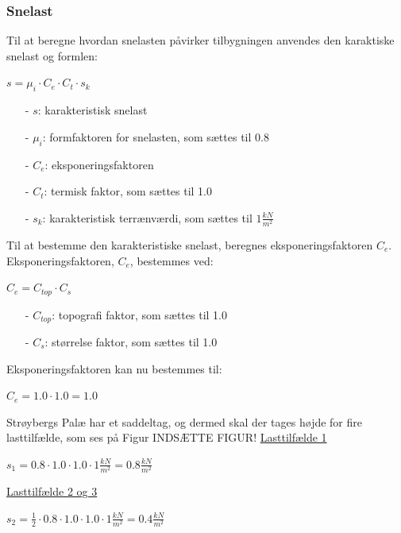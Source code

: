 \subsubsection{Snelast}
Til at beregne hvordan snelasten påvirker tilbygningen anvendes den karaktiske snelast og formlen:
\begin{center}
$s=\mu_i\cdot C_e\cdot C_t \cdot s_k$
\end{center}
\begin{itemize}
	\item[-] $s$: karakteristisk snelast
	\item[-] $\mu_i$: formfaktoren for snelasten, som sættes til 0.8 \citep[ tabel 5.2 kapitel 5.3]{EU91}
	\item[-] $C_e$: eksponeringsfaktoren
	\item[-] $C_t$: termisk faktor, som sættes til 1.0 \citep[ kapitel 5.2]{EU91}
	\item[-] $s_k$: karakteristisk terrænværdi, som sættes til $1 \frac{kN}{m^2}$ \citep[ kapitel 4.1]{EU91}
\end{itemize}
Til at bestemme den karakteristiske snelast, beregnes eksponeringsfaktoren $C_e$.
\newline
\newline
Eksponeringsfaktoren, $C_e$, bestemmes ved:
\begin{center}
$C_e=C_{top}\cdot C_s$
\end{center}
\begin{itemize}
	\item[-] $C_{top}$: topografi faktor, som sættes til 1.0 \citep[ tabel 5.1 kapitel 5.2]{EU91}
	\item[-] $C_s$: størrelse faktor, som sættes til 1.0 \citep[ kapitel 5.2]{EU91}
\end{itemize}
Eksponeringsfaktoren kan nu bestemmes til:
\begin{center}
$C_e=1.0\cdot 1.0=1.0$
\end{center}
Strøybergs Palæ har et saddeltag, og dermed skal der tages højde for fire lasttilfælde, som ses på Figur INDSÆTTE FIGUR!
\newline
\newline
\underline{Lasttilfælde 1}
\begin{center}
$s_1=0.8\cdot 1.0\cdot 1.0\cdot 1 \frac{kN}{m^2}=0.8 \frac{kN}{m^2}$
\end{center}
\underline{Lasttilfælde 2 og 3}
\begin{center}
$s_2=\frac{1}{2}\cdot 0.8\cdot 1.0\cdot 1.0\cdot 1 \frac{kN}{m^2}=0.4 \frac{kN}{m^2}$
\end{center}
